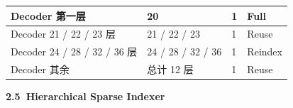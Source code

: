 \documentclass[zihao=false,fontset=windows]{ctexart}
\begin{document}
\begin{longtable}{|>{\raggedright\arraybackslash}p{3.28cm}|>{\raggedright\arraybackslash}p{3.28cm}|>{\raggedright\arraybackslash}p{3.28cm}|>{\raggedright\arraybackslash}p{3.28cm}|}
Decoder 第一层\par
 & 
20\par
 & 
1\par
 & 
Full\par
 \\ \hline

Decoder 21 / 22 / 23 层\par
 & 
21 / 22 / 23\par
 & 
1\par
 & 
Reuse\par
 \\ \hline

Decoder 24 / 28 / 32 / 36 层\par
 & 
24 / 28 / 32 / 36\par
 & 
1\par
 & 
Reindex\par
 \\ \hline

Decoder 其余\par
 & 
总计 12 层\par
 & 
1\par
 & 
Reuse\par
 \\ \hline
\end{longtable}


\par{}\vspace{0.8em}\noindent \begin{tcolorbox}[boxrule=0pt,arc=3pt,colback=callOrange,left=3pt,right=3pt,top=2pt,bottom=2pt,before skip=0pt,after skip=0pt]{\bfseries \textcolor{feishuBlue}{2.5}\ Hierarchical Sparse Indexer}\end{tcolorbox}\par\vspace{0.28em}
\end{document}
